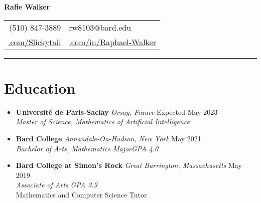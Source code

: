 \documentclass[12pt,letterpaper]{article}
\begin{document}
\begin{center}
	{\LARGE{\textbf{Rafie Walker}}}\\[0.05in]

	\begin{tabular}{r @{\hskip 0.1in}|@{\hskip 0.1in} l}
		(510) 847-3889 & rw8103@bard.edu \\
		 \href{https://github.com/Slickytail}{\faGithub.com/Slickytail} &
		 \href{https://linkedin.com/in/raphael-walker}{\faLinkedinSquare.com/in/Raphael-Walker}
	\end{tabular}
\end{center}
\hrule \vspace{-0.5em}

\section*{Education} \vspace{-0.5em}
\begin{itemize}[label=,itemsep=0pt]
    \item
    \textbf{Université de Paris-Saclay} \textit{Orsay, France} \hfill Expected May 2023\\
    \textit{Master of Science, Mathematics of Artificial Intelligence}
	\item
	\textbf{Bard College} \textit{Annandale-On-Hudson, New York} \hfill May 2021\\
    \textit{Bachelor of Arts, Mathematics Major}\hfill \textit{GPA 4.0}
	\item
	\textbf{Bard College at Simon's Rock} \textit{Great Barrington, Massachusetts} \hfill May 2019\\
	\textit{Associate of Arts} \hfill \textit{GPA 3.9}\\
	Mathematics and Computer Science Tutor
\end{itemize}
\vspace{-2em}
\end{document}
